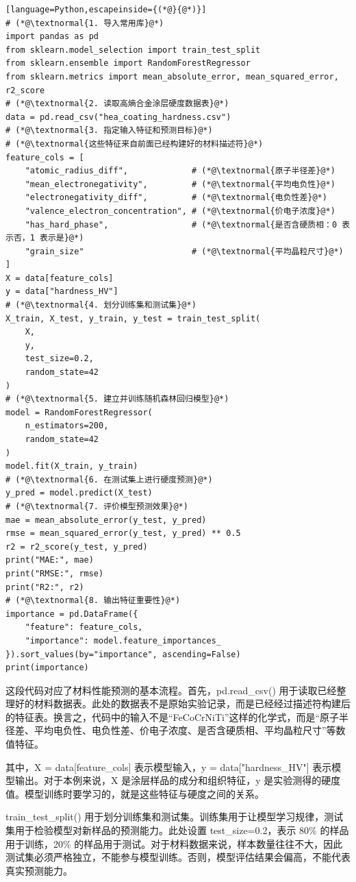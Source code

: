 \begin{lstlisting}[language=Python,escapeinside={(*@}{@*)}]
# (*@\textnormal{1. 导入常用库}@*)
import pandas as pd
from sklearn.model_selection import train_test_split
from sklearn.ensemble import RandomForestRegressor
from sklearn.metrics import mean_absolute_error, mean_squared_error, r2_score
# (*@\textnormal{2. 读取高熵合金涂层硬度数据表}@*)
data = pd.read_csv("hea_coating_hardness.csv")
# (*@\textnormal{3. 指定输入特征和预测目标}@*)
# (*@\textnormal{这些特征来自前面已经构建好的材料描述符}@*)
feature_cols = [
    "atomic_radius_diff",             # (*@\textnormal{原子半径差}@*)
    "mean_electronegativity",         # (*@\textnormal{平均电负性}@*)
    "electronegativity_diff",         # (*@\textnormal{电负性差}@*)
    "valence_electron_concentration", # (*@\textnormal{价电子浓度}@*)
    "has_hard_phase",                 # (*@\textnormal{是否含硬质相：0 表示否，1 表示是}@*)
    "grain_size"                      # (*@\textnormal{平均晶粒尺寸}@*)
]
X = data[feature_cols]
y = data["hardness_HV"]
# (*@\textnormal{4. 划分训练集和测试集}@*)
X_train, X_test, y_train, y_test = train_test_split(
    X,
    y,
    test_size=0.2,
    random_state=42
)
# (*@\textnormal{5. 建立并训练随机森林回归模型}@*)
model = RandomForestRegressor(
    n_estimators=200,
    random_state=42
)
model.fit(X_train, y_train)
# (*@\textnormal{6. 在测试集上进行硬度预测}@*)
y_pred = model.predict(X_test)
# (*@\textnormal{7. 评价模型预测效果}@*)
mae = mean_absolute_error(y_test, y_pred)
rmse = mean_squared_error(y_test, y_pred) ** 0.5
r2 = r2_score(y_test, y_pred)
print("MAE:", mae)
print("RMSE:", rmse)
print("R2:", r2)
# (*@\textnormal{8. 输出特征重要性}@*)
importance = pd.DataFrame({
    "feature": feature_cols,
    "importance": model.feature_importances_
}).sort_values(by="importance", ascending=False)
print(importance)
\end{lstlisting}

这段代码对应了材料性能预测的基本流程。首先，pd.read\_\allowbreak{}csv() 用于读取已经整理好的材料数据表。此处的数据表不是原始实验记录，而是已经经过描述符构建后的特征表。换言之，代码中的输入不是“FeCoCrNiTi”这样的化学式，而是“原子半径差、平均电负性、电负性差、价电子浓度、是否含硬质相、平均晶粒尺寸”等数值特征。


其中，X = data[feature\_\allowbreak{}cols] 表示模型输入，y = data["hardness\_\allowbreak{}HV"] 表示模型输出。对于本例来说，X 是涂层样品的成分和组织特征，y 是实验测得的硬度值。模型训练时要学习的，就是这些特征与硬度之间的关系。


train\_\allowbreak{}test\_\allowbreak{}split() 用于划分训练集和测试集。训练集用于让模型学习规律，测试集用于检验模型对新样品的预测能力。此处设置 test\_\allowbreak{}size=0.2，表示 80\% 的样品用于训练，20\% 的样品用于测试。对于材料数据来说，样本数量往往不大，因此测试集必须严格独立，不能参与模型训练。否则，模型评估结果会偏高，不能代表真实预测能力。


